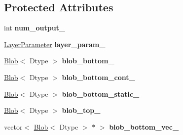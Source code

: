 \subsection*{Protected Attributes}
\begin{DoxyCompactItemize}
\item 
\mbox{\label{classcaffe_1_1_l_s_t_m_layer_test_af5694e2ebeac642f7aba8a64c292bf1c}} 
int {\bfseries num\+\_\+output\+\_\+}
\item 
\mbox{\label{classcaffe_1_1_l_s_t_m_layer_test_a7b70db3cc135f5ed9cc4fd920bee142e}} 
\mbox{\hyperlink{classcaffe_1_1_layer_parameter}{Layer\+Parameter}} {\bfseries layer\+\_\+param\+\_\+}
\item 
\mbox{\label{classcaffe_1_1_l_s_t_m_layer_test_a1148a9d9ce19f81acb472d53c673d3dc}} 
\mbox{\hyperlink{classcaffe_1_1_blob}{Blob}}$<$ Dtype $>$ {\bfseries blob\+\_\+bottom\+\_\+}
\item 
\mbox{\label{classcaffe_1_1_l_s_t_m_layer_test_a244113cbc25da0dd67127fd7cac75235}} 
\mbox{\hyperlink{classcaffe_1_1_blob}{Blob}}$<$ Dtype $>$ {\bfseries blob\+\_\+bottom\+\_\+cont\+\_\+}
\item 
\mbox{\label{classcaffe_1_1_l_s_t_m_layer_test_a04086a81f514ecf45909a402a84f73b8}} 
\mbox{\hyperlink{classcaffe_1_1_blob}{Blob}}$<$ Dtype $>$ {\bfseries blob\+\_\+bottom\+\_\+static\+\_\+}
\item 
\mbox{\label{classcaffe_1_1_l_s_t_m_layer_test_a6460abfd5ce4368e8750e147aece9a58}} 
\mbox{\hyperlink{classcaffe_1_1_blob}{Blob}}$<$ Dtype $>$ {\bfseries blob\+\_\+top\+\_\+}
\item 
\mbox{\label{classcaffe_1_1_l_s_t_m_layer_test_a2f62bc670eb66512afd64cc507b2bbdf}} 
vector$<$ \mbox{\hyperlink{classcaffe_1_1_blob}{Blob}}$<$ Dtype $>$ $\ast$ $>$ {\bfseries blob\+\_\+bottom\+\_\+vec\+\_\+}
\item 
\mbox{\label{classcaffe_1_1_l_s_t_m_layer_test_a539f5d5381a8cfe9554f6d4f579257ea}} 

\end{DoxyCompactItemize}

